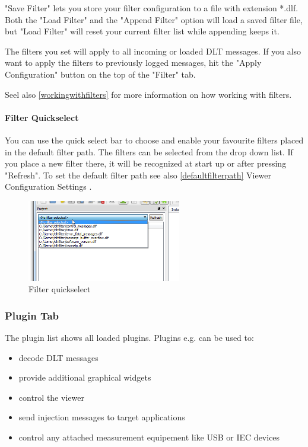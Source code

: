 \documentclass[a4paper,11pt]{article}
\begin{document}
"Save Filter" lets you store your filter configuration to a file with extension *.dlf.
Both the "Load Filter" and the "Append Filter" option will load a saved filter file, but "Load Filter" will reset your current filter list while appending keeps it.

The filters you set will apply to all incoming or loaded DLT messages. If you also want to apply the filters to previously logged messages, hit the
"Apply Configuration" button on the top of the "Filter" tab.

Seel also \autoref{workingwithfilters} for more information on how working with filters.

\paragraph{Filter Quickselect}
\label{filterquickselect}
You can use the quick select bar to choose and enable your favourite filters placed in the default filter path.
The filters can be selected from the drop down list. If you place a new filter there, it will be recognized at start up or after pressing "Refresh".
To set the default filter path see also \autoref{defaultfilterpath}{ Viewer Configuration Settings }.

\begin{figure}[H]
 \centering
 \includegraphics[width=0.6\textwidth]{images/selectfilter.png}
 \caption{Filter quickselect}
 \label{fig:filterquickselect}
\end{figure}


\subsubsection{Plugin Tab}
\label{plugintab}
The plugin list shows all loaded plugins.
Plugins e.g. can be used to:
\begin{itemize}
 \item decode DLT messages
 \item provide additional graphical widgets
 \item control the viewer
 \item send injection messages to target applications
 \item control any attached measurement equipement like USB or IEC devices
\end{itemize}
\end{document}
